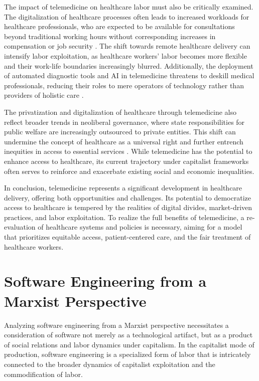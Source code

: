 \begin{refsection}
The impact of telemedicine on healthcare labor must also be critically examined. The digitalization of healthcare processes often leads to increased workloads for healthcare professionals, who are expected to be available for consultations beyond traditional working hours without corresponding increases in compensation or job security \cite[pp.~45-60]{engels_condition_of_working_class}. The shift towards remote healthcare delivery can intensify labor exploitation, as healthcare workers' labor becomes more flexible and their work-life boundaries increasingly blurred. Additionally, the deployment of automated diagnostic tools and AI in telemedicine threatens to deskill medical professionals, reducing their roles to mere operators of technology rather than providers of holistic care \cite[pp.~217-237]{foucault_biopolitics}.

The privatization and digitalization of healthcare through telemedicine also reflect broader trends in neoliberal governance, where state responsibilities for public welfare are increasingly outsourced to private entities. This shift can undermine the concept of healthcare as a universal right and further entrench inequities in access to essential services \cite[pp.~136-149]{hardt_negri_empire}. While telemedicine has the potential to enhance access to healthcare, its current trajectory under capitalist frameworks often serves to reinforce and exacerbate existing social and economic inequalities.

In conclusion, telemedicine represents a significant development in healthcare delivery, offering both opportunities and challenges. Its potential to democratize access to healthcare is tempered by the realities of digital divides, market-driven practices, and labor exploitation. To realize the full benefits of telemedicine, a re-evaluation of healthcare systems and policies is necessary, aiming for a model that prioritizes equitable access, patient-centered care, and the fair treatment of healthcare workers.

\section{Software Engineering from a Marxist Perspective}

Analyzing software engineering from a Marxist perspective necessitates a consideration of software not merely as a technological artifact, but as a product of social relations and labor dynamics under capitalism. In the capitalist mode of production, software engineering is a specialized form of labor that is intricately connected to the broader dynamics of capitalist exploitation and the commodification of labor.


\end{refsection}
